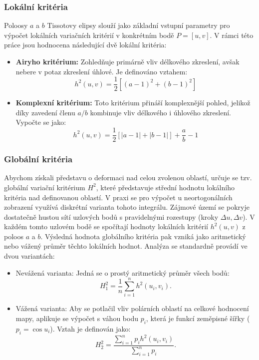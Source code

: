 \subsubsection*{Lokální kritéria}
Poloosy $a$ a $b$ Tissotovy elipsy slouží jako základní vstupní parametry pro výpočet lokálních variačních kritérií v konkrétním bodě $P=[u,v]$. 
V rámci této práce jsou hodnocena následující dvě lokální kritéria:
\begin{itemize}
	\item \textbf{Airyho kritérium:} Zohledňuje primárně vliv délkového zkreslení, avšak nebere v potaz zkreslení úhlové. Je definováno vztahem:
	\begin{equation*}
	h^{2}(u,v)=\frac{1}{2}[(a-1)^{2}+(b-1)^{2}]
	\end{equation*}
	
	\item  \textbf{Komplexní kritérium:} 
	Toto kritérium přináší komplexnější pohled, jelikož díky zavedení členu $a/b$ kombinuje vliv délkového i úhlového zkreslení. Vypočte se jako:
	\begin{equation*}
	h^{2}(u,v)=\frac{1}{2}[|a-1|+|b-1|]+\frac{a}{b}-1 
	\end{equation*}
	
\end{itemize}  
  
\subsubsection*{Globální kritéria}
Abychom získali představu o deformaci nad celou zvolenou oblastí, určuje se tzv. globální variační kritérium $H^2$, které představuje střední hodnotu lokálního kritéria nad definovanou oblastí.
V praxi se pro výpočet u neortogonálních zobrazení využívá diskrétní varianta tohoto integrálu. 
Zájmové území se pokryje dostatečně hustou sítí uzlových bodů s pravidelnými rozestupy (kroky $\Delta u, \Delta v$).
V každém tomto uzlovém bodě se spočítají hodnoty lokálních kritérií $h^2(u,v)$ z poloos $a$ a $b$.
Výsledná hodnota globálního kritéria pak vzniká jako aritmetický nebo vážený průměr těchto lokálních hodnot.
Analýza se standardně provádí ve dvou variantách:
\begin{itemize}
	\item Nevážená varianta: Jedná se o prostý aritmetický průměr všech bodů:
	\begin{equation*}
		H_{1}^{2}=\frac{1}{n}\sum_{i=1}^{n}h^{2}(u_{i},v_{i}).
	\end{equation*}
	
	\item  Vážená varianta: Aby se potlačil vliv polárních oblastí na celkové hodnocení mapy, aplikuje se výpočet s váhou bodu $p_i$, která je funkcí zeměpisné šířky ($p_i = \cos u_i$). Vztah je definován jako:
	\begin{equation*}
		H_{2}^{2}=\frac{\sum_{i=1}^{n}p_{i}h^{2}(u_{i},v_{i})}{\sum_{i=1}^{n}p_{i}}.
	\end{equation*}
\end{itemize}
 

